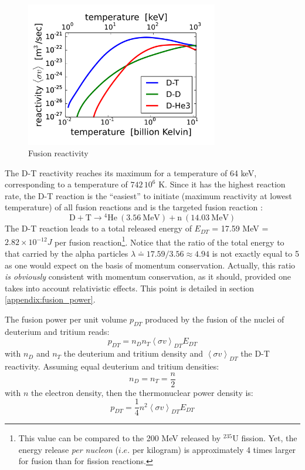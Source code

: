 \begin{figure} 
\begin{center}
\includegraphics[width=0.75\textwidth]{figures/reactivity_DT.png}
\caption{Fusion reactivity }
\label{fig:reactivity}
\end{center}
\end{figure}

The D-T reactivity reaches its maximum for a temperature of 64 keV, corresponding to a temperature of $742\,10^6$ K. Since it has the highest reaction rate, the D-T reaction is the “easiest” to initiate (maximum reactivity at lowest temperature) of all fusion reactions and is the targeted fusion reaction \cite{FusionCEA1987}: 
\begin{equation*}
\mathrm{D + T} \longrightarrow \mathrm{{}^4 He~(3.56~MeV) + n~(14.03~MeV)}
\end{equation*}
The D-T reaction leads to a total released energy of $E_{DT}$ = 17.59 \si{MeV} = $2.82\times 10^{-12} \si{J}$ per fusion reaction\footnote{This value can be compared to the 200 MeV released by $^{235}$U fission. Yet, the energy release \emph{per nucleon} ($i.e.$ per kilogram) is approximately 4 times larger for fusion than for fission reactions.}. Notice that the ratio of the total energy to that carried by the alpha particles $\lambda \doteq 17.59/3.56 \approx 4.94$ is not exactly equal to 5 as one would expect on the basis of momentum conservation. Actually, this ratio \emph{is obviously} consistent with momentum conservation, as it should, provided one takes into account relativistic effects. This point is detailed in section \ref{appendix:fusion_power}.

The fusion power per unit volume $p_{DT}$ produced by the fusion of the nuclei of deuterium and tritium reads: 
\begin{equation*}
  p_{DT} = n_D n_T \left< \sigma v \right>_{DT} E_{DT}
\end{equation*}
with $n_D$ and $n_T$ the deuterium and tritium density and $\left< \sigma v \right>_{DT}$ the D-T reactivity. Assuming equal deuterium and tritium densities:
\begin{equation*}
  n_D = n_T = \frac{n}{2}
\end{equation*}
with $n$ the electron density, then the thermonuclear power density is:
\begin{equation*}
  p_{DT} = \frac{1}{4} n^2 \left< \sigma v \right>_{DT} E_{DT}
\end{equation*}

